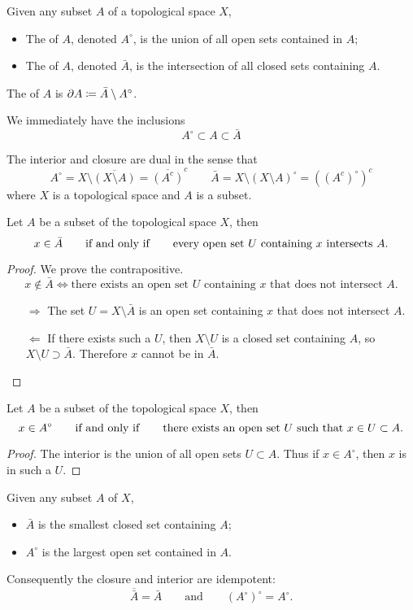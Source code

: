 \begin{definition}
Given any subset $A$ of a topological space $X$,
\begin{itemize}
\item The  of $A$, denoted $A^\circ$, is the union of all open sets contained in $A$;
\item The  of $A$, denoted $\bar{A}$, is the intersection of all closed sets containing $A$. 
\end{itemize}
The  of $A$ is $\partial A \coloneqq \bar{A}\setminus A^{\circ}$.
\end{definition}
We immediately have the inclusions
\[ A^\circ \subset A \subset \bar{A} \]

\begin{lemma}
The interior and closure are dual in the sense that
\[ A^\circ = X\setminus\overline{(X\setminus A)} = \overline{(A^c)}^c \qquad \bar{A} = X\setminus(X\setminus A)^\circ = ((A^c)^\circ)^c \]
where $X$ is a topological space and $A$ is a subset.
\end{lemma}
\begin{proposition}\label{closure}
Let $A$ be a subset of the topological space $X$, then
\[ x\in \bar{A} \qquad \text{\textup{if and only if}}\qquad \text{every open set $U$ containing $x$ intersects $A$}.\]
\end{proposition}
\begin{proof}
We prove the contrapositive.
\[ x\notin \bar{A} \iff \text{there exists an open set $U$ containing $x$ that does not intersect $A$.} \]
\begin{itemize}
\item[$\boxed{\Rightarrow}$] The set $U = X\setminus \bar{A}$ is an open set containing $x$ that does not intersect $A$.
\item[$\boxed{\Leftarrow}$] If there exists such a $U$, then $X\setminus U$ is a closed set containing $A$, so $X\setminus U \supset \bar{A}$. Therefore $x$ cannot be in $\bar{A}$.
\end{itemize}
\end{proof}
\begin{proposition}\label{interior}
Let $A$ be a subset of the topological space $X$, then
\[ x\in A^\circ \qquad \text{\textup{if and only if}}\qquad \text{there exists an open set $U$ such that $x\in U \subset A$}.\]
\end{proposition}
\begin{proof}
The interior is the union of all open sets $U\subset A$. Thus if $x\in A^\circ$, then $x$ is in such a $U$.
\end{proof}
\begin{lemma}
Given any subset $A$ of $X$,
\begin{itemize}
\item $\bar{A}$ is the smallest closed set containing $A$;
\item $A^\circ$ is the largest open set contained in $A$.
\end{itemize}
Consequently the closure and interior are idempotent:
\[ \overline{\bar{A}} = \bar{A} \qquad \text{and} \qquad (A^\circ)^\circ = A^\circ. \]
\end{lemma}

